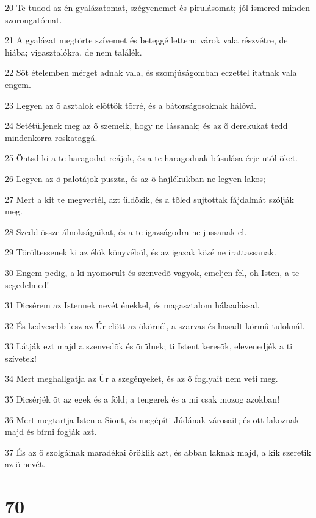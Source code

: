 \par 20 Te tudod az én gyalázatomat, szégyenemet és pirulásomat; jól ismered minden szorongatómat.
\par 21 A gyalázat megtörte szívemet és beteggé lettem; várok vala részvétre, de hiába; vigasztalókra, de nem találék.
\par 22 Sõt ételemben mérget adnak vala, és szomjúságomban eczettel itatnak vala engem.
\par 23 Legyen az õ asztalok elõttök tõrré, és a bátorságosoknak hálóvá.
\par 24 Setétüljenek meg az õ szemeik, hogy ne lássanak; és az õ derekukat tedd mindenkorra roskataggá.
\par 25 Öntsd ki a te haragodat reájok, és a te haragodnak búsulása érje utól õket.
\par 26 Legyen az õ palotájok puszta, és az õ hajlékukban ne legyen lakos;
\par 27 Mert a kit te megvertél, azt üldözik, és a tõled sujtottak fájdalmát szólják meg.
\par 28 Szedd össze álnokságaikat, és a te igazságodra ne jussanak el.
\par 29 Töröltessenek ki az élõk könyvébõl, és az igazak közé ne irattassanak.
\par 30 Engem pedig, a ki nyomorult és szenvedõ vagyok, emeljen fel, oh Isten, a te segedelmed!
\par 31 Dicsérem az Istennek nevét énekkel, és magasztalom hálaadással.
\par 32 És kedvesebb lesz az Úr elõtt az ökörnél, a szarvas és hasadt körmû tuloknál.
\par 33 Látják ezt majd a szenvedõk és örülnek; ti Istent keresõk, elevenedjék a ti szívetek!
\par 34 Mert meghallgatja az Úr a szegényeket, és az õ foglyait nem veti meg.
\par 35 Dicsérjék õt az egek és a föld; a tengerek és a mi csak mozog azokban!
\par 36 Mert megtartja Isten a Siont, és megépíti Júdának városait; és ott lakoznak majd és bírni fogják azt.
\par 37 És az õ szolgáinak maradékai öröklik azt, és abban laknak majd, a kik szeretik az õ nevét.

\chapter{70}

